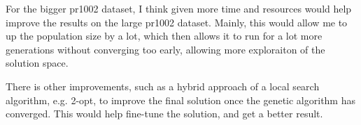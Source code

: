 \documentclass[11pt]{scrartcl} %
\begin{document}
For the bigger pr1002 dataset, I think given more time and resources would help improve the results on the large pr1002 dataset. 
Mainly, this would allow me to up the population size by a lot, which then allows it to run for a lot more generations without converging too early, allowing more exploraiton of the solution space.

There is other improvements, such as a hybrid approach of a local search algorithm, e.g. 2-opt, to improve the final solution once the genetic algorithm has converged. This would help fine-tune the solution, and get a better result.

\printbibliography
\end{document}
